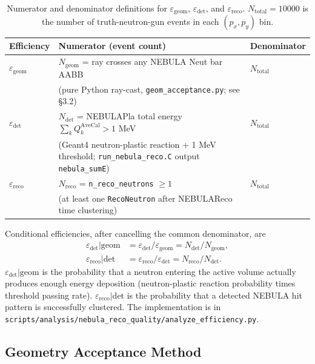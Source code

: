 \documentclass[a4paper,11pt]{article}
\begin{document}
\begin{table}[h]
\centering
\caption{Numerator and denominator definitions for
$\varepsilon_\mathrm{geom}$, $\varepsilon_\mathrm{det}$, and
$\varepsilon_\mathrm{reco}$. $N_\mathrm{total}=10000$ is the number of
truth-neutron-gun events in each $(p_x,p_y)$ bin.}
\label{tab:eps_defs}
\begin{tabular}{lll}
\toprule
Efficiency & Numerator (event count) & Denominator \\
\midrule
$\varepsilon_\mathrm{geom}$ &
$N_\mathrm{geom}$ = ray crosses any NEBULA Neut bar AABB &
$N_\mathrm{total}$ \\
& {\small (pure Python ray-cast, \texttt{geom\_acceptance.py}; see \S3.2)} & \\
\midrule
$\varepsilon_\mathrm{det}$ &
$N_\mathrm{det}$ = NEBULAPla total energy $\sum_k Q^\mathrm{AveCal}_k > 1$ MeV &
$N_\mathrm{total}$ \\
& {\small (Geant4 neutron-plastic reaction + 1 MeV threshold; \texttt{run\_nebula\_reco.C} output \texttt{nebula\_sumE})} & \\
\midrule
$\varepsilon_\mathrm{reco}$ &
$N_\mathrm{reco}$ = \texttt{n\_reco\_neutrons} $\geq 1$ &
$N_\mathrm{total}$ \\
& {\small (at least one \texttt{RecoNeutron} after NEBULAReco time clustering)} & \\
\bottomrule
\end{tabular}
\end{table}

Conditional efficiencies, after cancelling the common denominator, are
\begin{align*}
\varepsilon_\mathrm{det}|\mathrm{geom}
    &= \varepsilon_\mathrm{det} / \varepsilon_\mathrm{geom}
     = N_\mathrm{det} / N_\mathrm{geom}, \\
\varepsilon_\mathrm{reco}|\mathrm{det}
    &= \varepsilon_\mathrm{reco} / \varepsilon_\mathrm{det}
     = N_\mathrm{reco} / N_\mathrm{det}.
\end{align*}
$\varepsilon_\mathrm{det}|\mathrm{geom}$ is the probability that a neutron
entering the active volume actually produces enough energy deposition
(neutron-plastic reaction probability times threshold passing rate).
$\varepsilon_\mathrm{reco}|\mathrm{det}$ is the probability that a detected
NEBULA hit pattern is successfully clustered. The implementation is in
\texttt{scripts/analysis/nebula\_reco\_quality/analyze\_efficiency.py}.

\subsection{Geometry Acceptance Method}
\label{sec:geom_acceptance}
\end{document}
